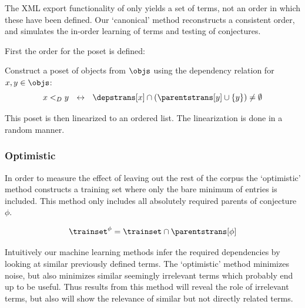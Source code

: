 The XML export functionality of \coq only yields a set of terms, not an order in which these have been defined.
Our `canonical' method reconstructs a consistent order, and simulates the in-order learning of terms and testing of conjectures.

First the order for the poset is defined:
\begin{definition}
  Construct a poset of objects from $\objs$ using the dependency relation for $x, y \in \objs$:
  \[
    x <_D y ~~\leftrightarrow~~ \depstrans[x] \cap (\parentstrans[y] \cup \{y\}) \neq \emptyset
  \]
\end{definition}

This poset is then linearized to an ordered list.
The linearization is done in a random manner.

\subsubsection{Optimistic}

In order to measure the effect of leaving out the rest of the corpus
the `optimistic' method constructs a training set where only the bare minimum of entries is included.
This method only includes all absolutely required parents of conjecture $\phi$.

\begin{definition}
  \[
    \trainset^{\phi} = \trainset \cap \parentstrans[\phi]
  \]
\end{definition}

Intuitively our machine learning methods infer the required dependencies by looking at similar previously defined terms.
The `optimistic' method minimizes noise, but also minimizes similar seemingly irrelevant terms which probably end up to be useful.
Thus results from this method will reveal the role of irrelevant terms, but also will show the relevance of similar but not directly related terms.




